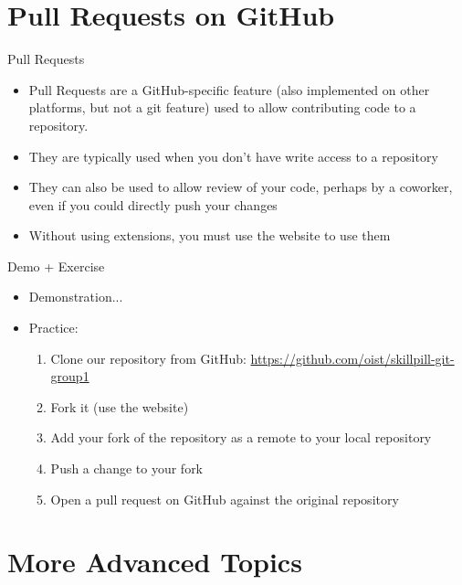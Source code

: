 \documentclass{beamer}
\begin{document}
\section{Pull Requests on GitHub}
\begin{frame}{Pull Requests}
  \begin{itemize}
    \item Pull Requests are a GitHub-specific feature (also implemented on other platforms, but not a git feature) used to allow contributing code to a repository.
    \item They are typically used when you don\rq{}t have write access to a repository
    \item They can also be used to allow review of your code, perhaps by a coworker, even if you could directly push your changes
    \item Without using extensions, you must use the website to use them
  \end{itemize}
\end{frame}

\begin{frame}
  \begin{block}{Demo + Exercise}
    \begin{itemize}
      \item Demonstration...
      \item Practice:
      \begin{enumerate}
        \item Clone our repository from GitHub: \url{https://github.com/oist/skillpill-git-group1}
        \item Fork it (use the website)
        \item Add your fork of the repository as a remote to your local repository
        \item Push a change to your fork
        \item Open a pull request on GitHub against the original repository
      \end{enumerate}
    \end{itemize}
  \end{block}
\end{frame}

\section{More Advanced Topics}
\end{document}
